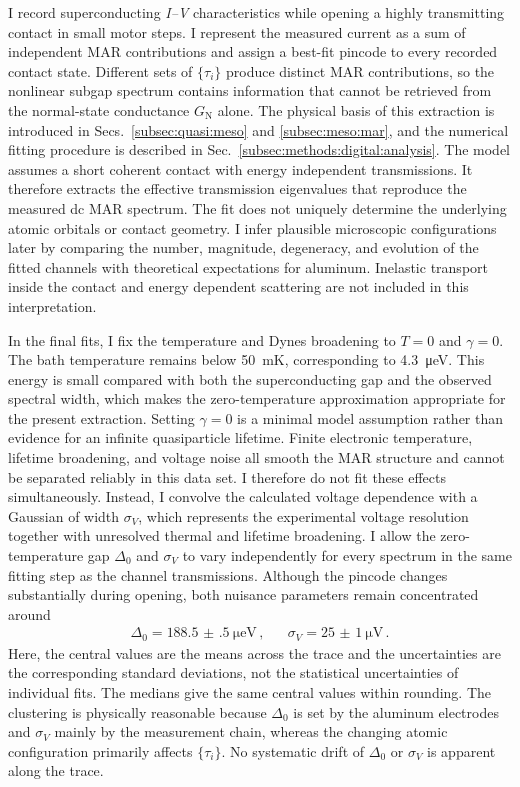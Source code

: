         I record superconducting \textit{I--V} characteristics while opening a highly transmitting contact in small motor steps. I represent the measured current as a sum of independent MAR contributions and assign a best-fit pincode to every recorded contact state. Different sets of $\{\tau_i\}$ produce distinct MAR contributions, so the nonlinear subgap spectrum contains information that cannot be retrieved from the normal-state conductance $G_\mathrm{N}$ alone. The physical basis of this extraction is introduced in Secs.~\ref{subsec:quasi:meso} and \ref{subsec:meso:mar}, and the numerical fitting procedure is described in Sec.~\ref{subsec:methods:digital:analysis}. The model assumes a short coherent contact with energy independent transmissions. It therefore extracts the effective transmission eigenvalues that reproduce the measured dc MAR spectrum. The fit does not uniquely determine the underlying atomic orbitals or contact geometry. I infer plausible microscopic configurations later by comparing the number, magnitude, degeneracy, and evolution of the fitted channels with theoretical expectations for aluminum. Inelastic transport inside the contact and energy dependent scattering are not included in this interpretation.

        In the final fits, I fix the temperature and Dynes broadening to $T=0$ and $\gamma=0$. The bath temperature remains below \qty{50}{\milli\kelvin}, corresponding to \qty{4.3}{\micro\electronvolt}. This energy is small compared with both the superconducting gap and the observed spectral width, which makes the zero-temperature approximation appropriate for the present extraction. Setting $\gamma=0$ is a minimal model assumption rather than evidence for an infinite quasiparticle lifetime. Finite electronic temperature, lifetime broadening, and voltage noise all smooth the MAR structure and cannot be separated reliably in this data set. I therefore do not fit these effects simultaneously. Instead, I convolve the calculated voltage dependence with a Gaussian of width $\sigma_V$, which represents the experimental voltage resolution together with unresolved thermal and lifetime broadening. I allow the zero-temperature gap $\Delta_0$ and $\sigma_V$ to vary independently for every spectrum in the same fitting step as the channel transmissions. Although the pincode changes substantially during opening, both nuisance parameters remain concentrated around
        \begin{align}
            \Delta_0 = \qty{188.5(5)}{\micro\electronvolt}\,, &&
            \sigma_V = \qty{25(1)}{\micro\volt}\,.
            \label{eq:ac:pincode:parameter}
        \end{align}
        Here, the central values are the means across the trace and the uncertainties are the corresponding standard deviations, not the statistical uncertainties of individual fits. The medians give the same central values within rounding. The clustering is physically reasonable because $\Delta_0$ is set by the aluminum electrodes and $\sigma_V$ mainly by the measurement chain, whereas the changing atomic configuration primarily affects $\{\tau_i\}$. No systematic drift of $\Delta_0$ or $\sigma_V$ is apparent along the trace.

